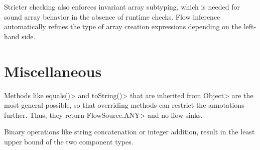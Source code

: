 \medskip

Stricter checking also enforces invariant array subtyping, which is
needed for sound array behavior in the absence of runtime checks.
Flow inference automatically refines the type of array creation
expressions depending on the left-hand side.

\section{Miscellaneous\label{sec:miscellaneous}}

Methods like \<equals()> and \<toString()> that are inherited from
\<Object> are the most general possible, so that overriding methods
can restrict the annotations further. Thus, they
return \<FlowSource.ANY> and no flow sinks.

Binary operations like string concatenation or integer addition,
result in the least upper bound of the two component types.





